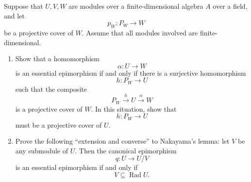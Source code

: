     
    \begin{exercise}
    Suppose that \(U,V,W\) are modules over a finite-dimensional algebra \(A\) over a field,
    and let
    \[
    p_W:P_W\longrightarrow W
    \]
    be a projective cover of \(W\). Assume that all modules involved are finite-dimensional.
    
    \begin{enumerate}
        \item[(a)] Show that a homomorphism
        \[
        \alpha:U\longrightarrow W
        \]
        is an essential epimorphism if and only if there is a surjective homomorphism
        \[
        h:P_W\longrightarrow U
        \]
        such that the composite
        \[
        P_W \xrightarrow{\,h\,} U \xrightarrow{\,\alpha\,} W
        \]
        is a projective cover of \(W\). In this situation, show that
        \[
        h:P_W\longrightarrow U
        \]
        must be a projective cover of \(U\).
    
        \item[(b)] Prove the following ``extension and converse'' to Nakayama's lemma:
        let \(V\) be any submodule of \(U\). Then the canonical epimorphism
        \[
        q:U\longrightarrow U/V
        \]
        is an essential epimorphism if and only if
        \[
        V\subseteq \operatorname{Rad}U.
        \]
    \end{enumerate}
    \end{exercise}
    

